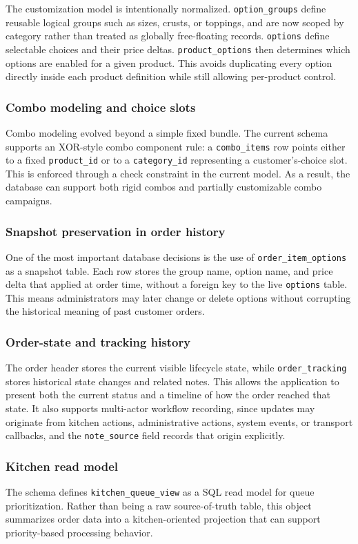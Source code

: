 The customization model is intentionally normalized. \texttt{option\_groups} define reusable logical groups such as sizes, crusts, or toppings, and are now scoped by category rather than treated as globally free-floating records. \texttt{options} define selectable choices and their price deltas. \texttt{product\_options} then determines which options are enabled for a given product. This avoids duplicating every option directly inside each product definition while still allowing per-product control.

\subsubsection{Combo modeling and choice slots}

Combo modeling evolved beyond a simple fixed bundle. The current schema supports an XOR-style combo component rule: a \texttt{combo\_items} row points either to a fixed \texttt{product\_id} or to a \texttt{category\_id} representing a customer's-choice slot. This is enforced through a check constraint in the current model. As a result, the database can support both rigid combos and partially customizable combo campaigns.

\subsubsection{Snapshot preservation in order history}

One of the most important database decisions is the use of \texttt{order\_item\_options} as a snapshot table. Each row stores the group name, option name, and price delta that applied at order time, without a foreign key to the live \texttt{options} table. This means administrators may later change or delete options without corrupting the historical meaning of past customer orders.

\subsubsection{Order-state and tracking history}

The order header stores the current visible lifecycle state, while \texttt{order\_tracking} stores historical state changes and related notes. This allows the application to present both the current status and a timeline of how the order reached that state. It also supports multi-actor workflow recording, since updates may originate from kitchen actions, administrative actions, system events, or transport callbacks, and the \texttt{note\_source} field records that origin explicitly.

\subsubsection{Kitchen read model}

The schema defines \texttt{kitchen\_queue\_view} as a SQL read model for queue prioritization. Rather than being a raw source-of-truth table, this object summarizes order data into a kitchen-oriented projection that can support priority-based processing behavior.
